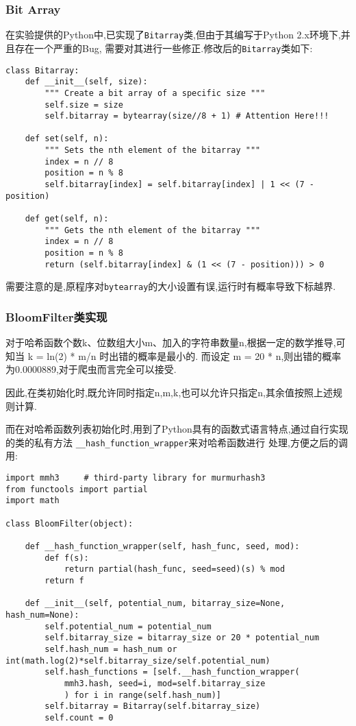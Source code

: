 \documentclass[a4paper]{article}
\begin{document}
            \subsubsection{Bit Array}
在实验提供的Python中,已实现了\texttt{Bitarray}类,但由于其编写于Python 2.x环境下,并且存在一个严重的Bug,
需要对其进行一些修正.修改后的\texttt{Bitarray}类如下:
\begin{verbatim}
class Bitarray:
    def __init__(self, size):
        """ Create a bit array of a specific size """
        self.size = size
        self.bitarray = bytearray(size//8 + 1) # Attention Here!!!

    def set(self, n):
        """ Sets the nth element of the bitarray """
        index = n // 8
        position = n % 8
        self.bitarray[index] = self.bitarray[index] | 1 << (7 - position)

    def get(self, n):
        """ Gets the nth element of the bitarray """
        index = n // 8
        position = n % 8
        return (self.bitarray[index] & (1 << (7 - position))) > 0
\end{verbatim}

需要注意的是,原程序对\texttt{bytearray}的大小设置有误,运行时有概率导致下标越界.
            \subsubsection{BloomFilter类实现}
对于哈希函数个数k、位数组大小m、加入的字符串数量n,根据一定的数学推导,可知当 k = ln(2) * m/n 时出错的概率是最小的.
而设定 m = 20 * n,则出错的概率为0.0000889,对于爬虫而言完全可以接受.

因此,在类初始化时,既允许同时指定n,m,k,也可以允许只指定n,其余值按照上述规则计算.

而在对哈希函数列表初始化时,用到了Python具有的函数式语言特点,通过自行实现的类的私有方法
\texttt{__hash_function_wrapper}来对哈希函数进行
处理,方便之后的调用:

\begin{verbatim}
import mmh3     # third-party library for murmurhash3
from functools import partial
import math

class BloomFilter(object):

    def __hash_function_wrapper(self, hash_func, seed, mod):
        def f(s):
            return partial(hash_func, seed=seed)(s) % mod
        return f

    def __init__(self, potential_num, bitarray_size=None, hash_num=None):
        self.potential_num = potential_num
        self.bitarray_size = bitarray_size or 20 * potential_num
        self.hash_num = hash_num or int(math.log(2)*self.bitarray_size/self.potential_num)
        self.hash_functions = [self.__hash_function_wrapper(
            mmh3.hash, seed=i, mod=self.bitarray_size
            ) for i in range(self.hash_num)]
        self.bitarray = Bitarray(self.bitarray_size)
        self.count = 0
\end{verbatim}
\end{document}
